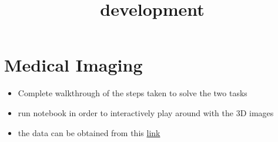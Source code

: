\documentclass[11pt]{article}
\title{development}
\providecommand{\tightlist}{%
      \setlength{\itemsep}{0pt}\setlength{\parskip}{0pt}}
\begin{document}
    
    \maketitle
    
    

    
    \hypertarget{medical-imaging}{%
\section{Medical Imaging}\label{medical-imaging}}

\begin{itemize}
\tightlist
\item
  Complete walkthrough of the steps taken to solve the two tasks
\item
  run notebook in order to interactively play around with the 3D images
\item
  the data can be obtained from this
  \href{https://drive.google.com/drive/folders/1vVpu9lgjqHB4UX9xLweQGW4qgAjCaOAh?usp=drive_link}{link}
\end{itemize}
\end{document}
